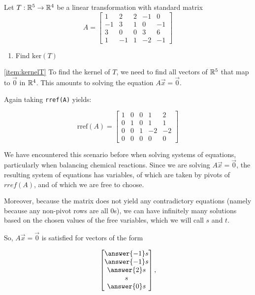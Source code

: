 \documentclass{ximera}
\begin{document}
\begin{center}
\end{center}
 
\begin{example}\label{ex:kernel} Let $T:\mathbb{R}^5\rightarrow \mathbb{R}^4$ be a linear transformation with standard matrix $$A=\begin{bmatrix}1 & 2 & 2 &-1 & 0\\-1 & 3 & 1 & 0 & -1\\3 & 0 & 0 & 3 & 6\\ 1 & -1 & 1 & -2 & -1\end{bmatrix}$$
\begin{enumerate}
\item \label{item:kernelT}
Find $\mbox{ker}(T)$
\end{enumerate}
\begin{explanation}
\ref{item:kernelT} To find the kernel of $T$, we need to find all vectors of $\mathbb{R}^5$ that map to $\vec{0}$ in $\mathbb{R}^4$.  This amounts to solving the equation $A\vec{x}=\vec{0}$.
 
Again taking \texttt{rref(A)} yields:
 
$$\mbox{rref}(A)= \begin{bmatrix} 1 & 0 & 0 & 1 & 2\\0 & 1 & 0 & 1 & 1\\0 & 0 & 1 & -2 & -2\\ 0 & 0 & 0 & 0 & 0 \end{bmatrix}$$
 
We have encountered this scenario before when solving systems of equations, particularly when balancing chemical reactions. Since we are solving $A\vec{x}=\vec{0}$, the resulting system of equations has  variables,  of which are taken by pivots of $rref(A)$, and  of which we are free to choose. 

Moreover, because the matrix does not yield any contradictory equations (namely because any non-pivot rows are all $0$s), we can have infinitely many solutions based on the chosen values of the free variables, which we will call $s$ and $t$.

So, $A\vec{x}=\vec{0}$ is satisfied for vectors of the form 

$$\begin{bmatrix}\answer{-1}s\\\answer{-1}s\\\answer{2}s\\s\\\answer{0}s\end{bmatrix},$$


\end{explanation}
\end{example}
\end{document}
